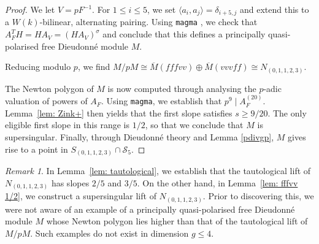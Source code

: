\documentclass[11pt,table]{amsart}
\numberwithin{equation}{section}
\theoremstyle{definition}
\theoremstyle{remark}
\theoremstyle{remark}
\newtheorem{remark}[equation]{Remark}
\begin{document}
\begin{proof}
We let $V=pF^{-1}$. For $1\leq i\leq 5$, we set $\langle a_i, a_{j}\rangle=\delta_{i+5,j}$ and extend this to a $W(k)$-bilinear, alternating pairing. Using \texttt{magma} \cite{Magma}, we check that $A_F^TH=HA_V=(HA_V)^\sigma$ and conclude that this defines a principally quasi-polarised free Dieudonn\'{e} module $M$.

Reducing modulo $p$, we find $M/pM \cong \overline{M}(fffvv) \oplus \overline{M}(vvvff) \cong N_{(0,1,1,2,3)}$. 

The Newton polygon of $M$ is now computed through analysing the $p$-adic valuation of powers of $A_F$. Using \texttt{magma}, we establish that $p^9 \mid A_F^{(20)}$. Lemma~\ref{lem: Zink+} then yields that the first slope satisfies $s\geq 9/20$. The only eligible first slope in this range is $1/2$, so that we conclude that $M$ is supersingular.  Finally, through Dieudonn\'{e} theory and Lemma \ref{pdivgp}, $M$ gives rise to a point in $S_{(0,1,1,2,3)} \cap \mathcal{S}_5$.
\end{proof}

\begin{remark} \label{rmk: TL not highest}
In Lemma~\ref{lem: tautological}, we establish that the tautological lift of $N_{(0,1,1,2,3)}$ has slopes $2/5$ and $3/5$. On the other hand, in Lemma~\ref{lem: fffvv 1/2}, we construct a supersingular lift of $N_{(0,1,1,2,3)}$. Prior to discovering this, we were not aware of an example of a principally quasi-polarised free Dieudonn\'{e} module $M$ whose Newton polygon lies higher than that of the tautological lift of $M/pM$. Such examples do not exist in dimension $g \leq 4$.
\end{remark}
\end{document}
